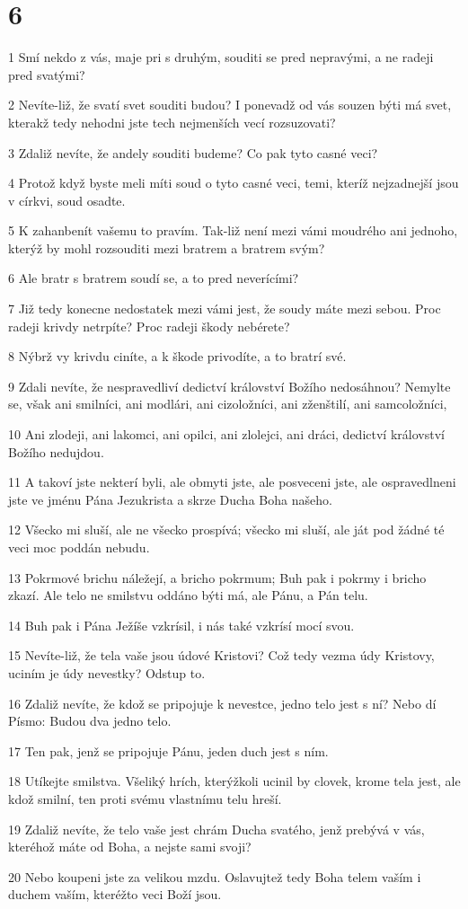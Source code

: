 \chapter{6}

\par 1 Smí nekdo z vás, maje pri s druhým, souditi se pred nepravými, a ne radeji pred svatými?
\par 2 Nevíte-liž, že svatí svet souditi budou? I ponevadž od vás souzen býti má svet, kterakž tedy nehodni jste tech nejmenších vecí rozsuzovati?
\par 3 Zdaliž nevíte, že andely souditi budeme? Co pak tyto casné veci?
\par 4 Protož když byste meli míti soud o tyto casné veci, temi, kteríž nejzadnejší jsou v církvi, soud osadte.
\par 5 K zahanbenít vašemu to pravím. Tak-liž není mezi vámi moudrého ani jednoho, kterýž by mohl rozsouditi mezi bratrem a bratrem svým?
\par 6 Ale bratr s bratrem soudí se, a to pred neverícími?
\par 7 Již tedy konecne nedostatek mezi vámi jest, že soudy máte mezi sebou. Proc radeji krivdy netrpíte? Proc radeji škody nebérete?
\par 8 Nýbrž vy krivdu ciníte, a k škode privodíte, a to bratrí své.
\par 9 Zdali nevíte, že nespravedliví dedictví království Božího nedosáhnou? Nemylte se, však ani smilníci, ani modlári, ani cizoložníci, ani zženštilí, ani samcoložníci,
\par 10 Ani zlodeji, ani lakomci, ani opilci, ani zlolejci, ani dráci, dedictví království Božího nedujdou.
\par 11 A takoví jste nekterí byli, ale obmyti jste, ale posveceni jste, ale ospravedlneni jste ve jménu Pána Jezukrista a skrze Ducha Boha našeho.
\par 12 Všecko mi sluší, ale ne všecko prospívá; všecko mi sluší, ale ját pod žádné té veci moc poddán nebudu.
\par 13 Pokrmové brichu náležejí, a bricho pokrmum; Buh pak i pokrmy i bricho zkazí. Ale telo ne smilstvu oddáno býti má, ale Pánu, a Pán telu.
\par 14 Buh pak i Pána Ježíše vzkrísil, i nás také vzkrísí mocí svou.
\par 15 Nevíte-liž, že tela vaše jsou údové Kristovi? Což tedy vezma údy Kristovy, uciním je údy nevestky? Odstup to.
\par 16 Zdaliž nevíte, že kdož se pripojuje k nevestce, jedno telo jest s ní? Nebo dí Písmo: Budou dva jedno telo.
\par 17 Ten pak, jenž se pripojuje Pánu, jeden duch jest s ním.
\par 18 Utíkejte smilstva. Všeliký hrích, kterýžkoli ucinil by clovek, krome tela jest, ale kdož smilní, ten proti svému vlastnímu telu hreší.
\par 19 Zdaliž nevíte, že telo vaše jest chrám Ducha svatého, jenž prebývá v vás, kteréhož máte od Boha, a nejste sami svoji?
\par 20 Nebo koupeni jste za velikou mzdu. Oslavujtež tedy Boha telem vaším i duchem vaším, kteréžto veci Boží jsou.

